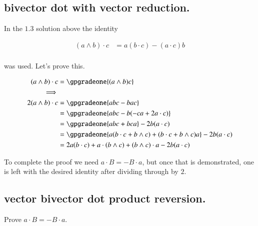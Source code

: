\subsection{bivector dot with vector reduction. }

In the $1.3$ solution above the identity

\begin{align}
(a \wedge b) \cdot c &= a (b \cdot c) - (a \cdot c) b \\
\end{align}

was used.  Let's prove this.

\begin{align*}
(a \wedge b) \cdot c
&= \gpgradeone{(a \wedge b) c} \\
\implies \\
2 (a \wedge b) \cdot c
&= \gpgradeone{a b c - b a c} \\
&= \gpgradeone{a b c - b (- c a + 2 a \cdot c )} \\
&= \gpgradeone{a b c + b c a} - 2 b (a \cdot c ) \\
&= \gpgradeone{a (b \cdot c + b \wedge c) + (b \cdot c + b \wedge c) a} - 2 b (a \cdot c ) \\
&= 2 a (b \cdot c) + a \cdot (b \wedge c) + (b \wedge c) \cdot a - 2 b (a \cdot c ) \\
\end{align*}

To complete the proof we need $a \cdot B = -B \cdot a$, but once that is demonstrated, one is left with the desired identity after dividing through
by $2$.

\subsection{vector bivector dot product reversion. }

Prove $a \cdot B = -B \cdot a$.
